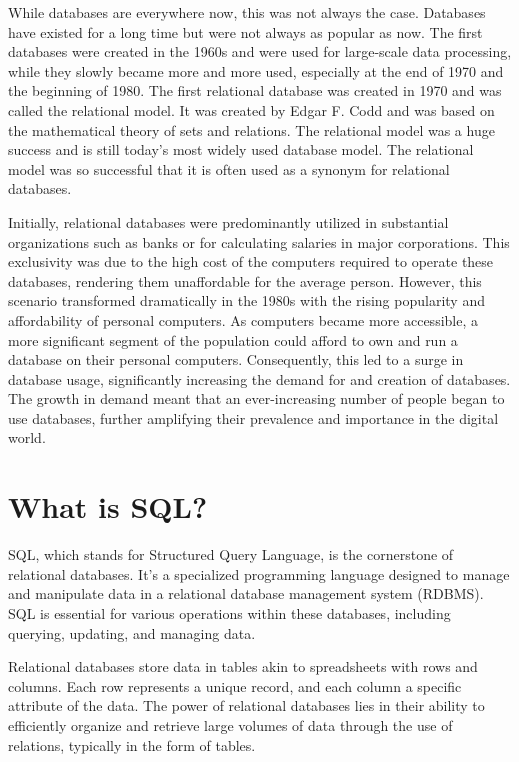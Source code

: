While databases are everywhere now, this was not always the case. Databases have existed for a long time but were not always as popular as now. The first databases were created in the 1960s and were used for large-scale data processing, while they slowly became more and more used, especially at the end of 1970 and the beginning of 1980. The first relational database was created in 1970 and was called the relational model. It was created by Edgar F. Codd and was based on the mathematical theory of sets and relations. The relational model was a huge success and is still today's most widely used database model. The relational model was so successful that it is often used as a synonym for relational databases.

Initially, relational databases were predominantly utilized in substantial organizations such as banks or for calculating salaries in major corporations. This exclusivity was due to the high cost of the computers required to operate these databases, rendering them unaffordable for the average person. However, this scenario transformed dramatically in the 1980s with the rising popularity and affordability of personal computers. As computers became more accessible, a more significant segment of the population could afford to own and run a database on their personal computers. Consequently, this led to a surge in database usage, significantly increasing the demand for and creation of databases. The growth in demand meant that an ever-increasing number of people began to use databases, further amplifying their prevalence and importance in the digital world.

\section{What is SQL?}
SQL, which stands for Structured Query Language, is the cornerstone of relational databases. It's a specialized programming language designed to manage and manipulate data in a relational database management system (RDBMS). SQL is essential for various operations within these databases, including querying, updating, and managing data.

Relational databases store data in tables akin to spreadsheets with rows and columns. Each row represents a unique record, and each column a specific attribute of the data. The power of relational databases lies in their ability to efficiently organize and retrieve large volumes of data through the use of relations, typically in the form of tables.

